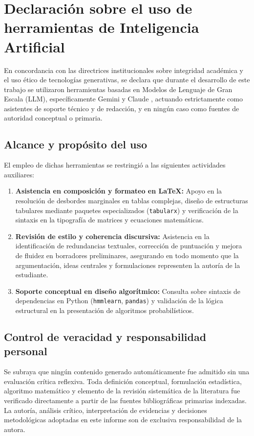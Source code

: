 \chapter{Declaración sobre el uso de herramientas de Inteligencia Artificial}

En concordancia con las directrices institucionales sobre integridad académica y el uso ético de tecnologías generativas, se declara que durante el desarrollo de este trabajo se utilizaron herramientas basadas en Modelos de Lenguaje de Gran Escala (LLM), específicamente Gemini \parencite{google2024gemini} y Claude \parencite{anthropic2024claude}, actuando estrictamente como asistentes de soporte técnico y de redacción, y en ningún caso como fuentes de autoridad conceptual o primaria.

\section{Alcance y propósito del uso}
El empleo de dichas herramientas se restringió a las siguientes actividades auxiliares:
\begin{enumerate}
    \item \textbf{Asistencia en composición y formateo en LaTeX:} Apoyo en la resolución de desbordes marginales en tablas complejas, diseño de estructuras tabulares mediante paquetes especializados (\texttt{tabularx}) y verificación de la sintaxis en la tipografía de matrices y ecuaciones matemáticas.
    \item \textbf{Revisión de estilo y coherencia discursiva:} Asistencia en la identificación de redundancias textuales, corrección de puntuación y mejora de fluidez en borradores preliminares, asegurando en todo momento que la argumentación, ideas centrales y formulaciones representen la autoría de la estudiante.
    \item \textbf{Soporte conceptual en diseño algorítmico:} Consulta sobre sintaxis de dependencias en Python (\texttt{hmmlearn}, \texttt{pandas}) y validación de la lógica estructural en la presentación de algoritmos probabilísticos.
\end{enumerate}

\section{Control de veracidad y responsabilidad personal}
Se subraya que ningún contenido generado automáticamente fue admitido sin una evaluación crítica reflexiva. Toda definición conceptual, formulación estadística, algoritmo matemático y elemento de la revisión sistemática de la literatura fue verificado directamente a partir de las fuentes bibliográficas primarias indexadas. La autoría, análisis crítico, interpretación de evidencias y decisiones metodológicas adoptadas en este informe son de exclusiva responsabilidad de la autora.